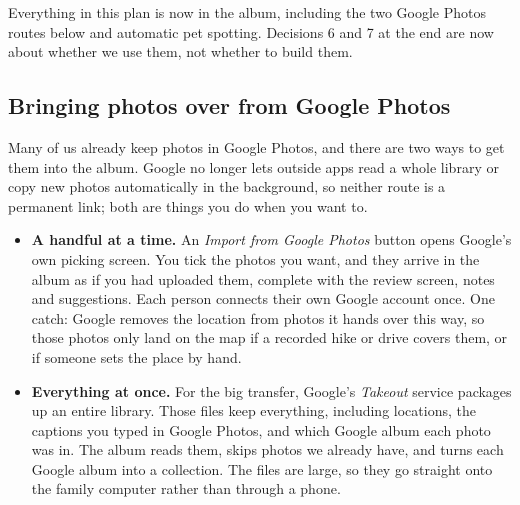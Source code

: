 \documentclass[11pt,a4paper]{article}
\begin{document}
\begin{note}
Everything in this plan is now in the album, including the two Google Photos routes below and automatic pet spotting. Decisions 6 and 7 at the end are now about whether we use them, not whether to build them.
\end{note}

\subsection{Bringing photos over from Google Photos}

Many of us already keep photos in Google Photos, and there are two ways to get them into the album. Google no longer lets outside apps read a whole library or copy new photos automatically in the background, so neither route is a permanent link; both are things you do when you want to.

\begin{itemize}
  \item \textbf{A handful at a time.} An \emph{Import from Google Photos} button opens Google's own picking screen. You tick the photos you want, and they arrive in the album as if you had uploaded them, complete with the review screen, notes and suggestions. Each person connects their own Google account once. One catch: Google removes the location from photos it hands over this way, so those photos only land on the map if a recorded hike or drive covers them, or if someone sets the place by hand.
  \item \textbf{Everything at once.} For the big transfer, Google's \emph{Takeout} service packages up an entire library. Those files keep everything, including locations, the captions you typed in Google Photos, and which Google album each photo was in. The album reads them, skips photos we already have, and turns each Google album into a collection. The files are large, so they go straight onto the family computer rather than through a phone.
\end{itemize}
\end{document}
